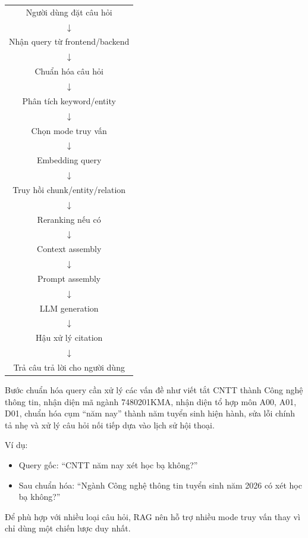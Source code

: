 \begin{center}
\begin{tabular}{c}
Người dùng đặt câu hỏi \\
$\downarrow$ \\
Nhận query từ frontend/backend \\
$\downarrow$ \\
Chuẩn hóa câu hỏi \\
$\downarrow$ \\
Phân tích keyword/entity \\
$\downarrow$ \\
Chọn mode truy vấn \\
$\downarrow$ \\
Embedding query \\
$\downarrow$ \\
Truy hồi chunk/entity/relation \\
$\downarrow$ \\
Reranking nếu có \\
$\downarrow$ \\
Context assembly \\
$\downarrow$ \\
Prompt assembly \\
$\downarrow$ \\
LLM generation \\
$\downarrow$ \\
Hậu xử lý citation \\
$\downarrow$ \\
Trả câu trả lời cho người dùng
\end{tabular}
\end{center}

Bước chuẩn hóa query cần xử lý các vấn đề như viết tắt CNTT thành Công nghệ thông tin, nhận diện mã ngành 7480201KMA, nhận diện tổ hợp môn A00, A01, D01, chuẩn hóa cụm ``năm nay'' thành năm tuyển sinh hiện hành, sửa lỗi chính tả nhẹ và xử lý câu hỏi nối tiếp dựa vào lịch sử hội thoại.

Ví dụ:

\begin{itemize}
    \item Query gốc: ``CNTT năm nay xét học bạ không?''
    \item Sau chuẩn hóa: ``Ngành Công nghệ thông tin tuyển sinh năm 2026 có xét học bạ không?''
\end{itemize}

Để phù hợp với nhiều loại câu hỏi, RAG nên hỗ trợ nhiều mode truy vấn thay vì chỉ dùng một chiến lược duy nhất.

